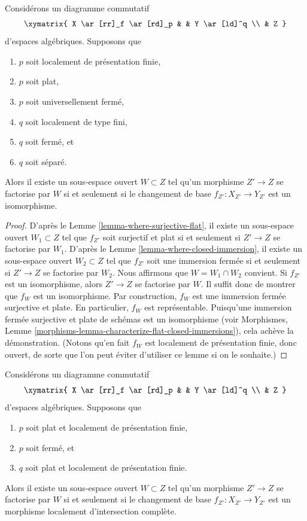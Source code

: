 \begin{lemma}
\label{lemma-where-isomorphism}
Considérons un diagramme commutatif
$$
\xymatrix{
X \ar[rr]_f \ar[rd]_p & & Y \ar[ld]^q \\
& Z
}
$$
d'espaces algébriques. Supposons que
\begin{enumerate}
\item $p$ soit localement de présentation finie,
\item $p$ soit plat,
\item $p$ soit universellement fermé,
\item $q$ soit localement de type fini,
\item $q$ soit fermé, et
\item $q$ soit séparé.
\end{enumerate}
Alors il existe un sous-espace ouvert $W \subset Z$
tel qu'un morphisme $Z' \to Z$ se factorise par $W$ si et seulement si le
changement de base $f_{Z'} : X_{Z'} \to Y_{Z'}$ est un isomorphisme.
\end{lemma}

\begin{proof}
D'après le
Lemme \ref{lemma-where-surjective-flat},
il existe un sous-espace ouvert $W_1 \subset Z$ tel que
$f_{Z'}$ soit surjectif et plat si et seulement si $Z' \to Z$
se factorise par $W_1$. D'après le
Lemme \ref{lemma-where-closed-immersion},
il existe un sous-espace ouvert $W_2 \subset Z$ tel que
$f_{Z'}$ soit une immersion fermée si et seulement si $Z' \to Z$
se factorise par $W_2$. Nous affirmons que $W = W_1 \cap W_2$ convient.
Si $f_{Z'}$ est un isomorphisme, alors $Z' \to Z$
se factorise par $W$. Il suffit donc de montrer que
$f_W$ est un isomorphisme. Par construction, $f_W$ est une
immersion fermée surjective et plate. En particulier, $f_W$ est
représentable. Puisqu'une immersion fermée surjective et plate de
schémas est un isomorphisme (voir
Morphismes, Lemme \ref{morphisms-lemma-characterize-flat-closed-immersions}),
cela achève la démonstration. (Notons qu'en fait $f_W$ est localement de présentation finie,
donc ouvert, de sorte que l'on peut éviter d'utiliser ce lemme si on le souhaite.)
\end{proof}

\begin{lemma}
\label{lemma-where-lci}
Considérons un diagramme commutatif
$$
\xymatrix{
X \ar[rr]_f \ar[rd]_p & & Y \ar[ld]^q \\
& Z
}
$$
d'espaces algébriques. Supposons que
\begin{enumerate}
\item $p$ soit plat et localement de présentation finie,
\item $p$ soit fermé, et
\item $q$ soit plat et localement de présentation finie.
\end{enumerate}
Alors il existe un sous-espace ouvert $W \subset Z$
tel qu'un morphisme $Z' \to Z$ se factorise par $W$ si et seulement si le
changement de base $f_{Z'} : X_{Z'} \to Y_{Z'}$ est un morphisme localement d'intersection
complète.
\end{lemma}

